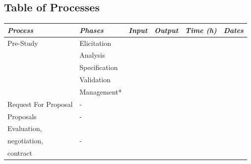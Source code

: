 \documentclass[a4paper]{article}
\begin{document}
\subsection{Table of Processes}
\begin{table}[!ht]
	\centering
	\begin{tabular}{|p{2cm}| p{3cm} |l| p{2cm} | p{2cm} | p{1cm}|}
	\hline
		\textit{Process} & \textit{Phases} & \textit{Input} & \textit{Output} & \textit{Time (h)} & \textit{Dates} \\
	\hline
		Pre-Study & Elicitation & & & &\\
				  & Analysis & & &  &\\
				  & Specification & & & &\\
				  & Validation & & & &\\
				  & Management* & & & &\\ \hline
		Request For Proposal & - & & & &\\ \hline
		Proposals & - & & & &\\ \hline
		Evaluation, &  & & & &\\
		negotiation, & - & & & &\\
		contract & & & & &\\
	\hline
	
	\end{tabular}
\end{table}
\end{document}
